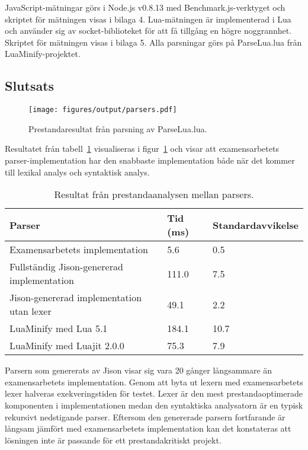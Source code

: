 JavaScript-mätningar görs i Node.js v0.8.13 med Benchmark.js-verktyget och
skriptet för mätningen visas i bilaga 4. Lua-mätningen är implementerad i Lua
och använder sig av socket-biblioteket för att få tillgång en högre
noggrannhet. Skriptet för mätningen visas i bilaga 5. Alla parsningar görs på
ParseLua.lua från LuaMinify-projektet.

\subsection{Slutsats}

\begin{figure}[ht]
  \texttt{[image: figures/output/parsers.pdf]}
  \caption{Prestandaresultat från parsning av ParseLua.lua.}
  \label{fig:parserresult}
\end{figure}

Resultatet från tabell~\ref{tab:parsers} visualiseras i
figur~\ref{fig:parserresult} och visar att examensarbetets
parser-implementation har den snabbaste implementation både när det kommer
till lexikal analys och syntaktisk analys.

\begin{table}[ht]
  \caption{Resultat från prestandaanalysen mellan parsers.}
  \begin{tabular}{l l l}
    Parser & Tid (ms) & Standardavvikelse \\
    \hline
    Examensarbetets implementation & 5.6 & 0.5 \\
    Fullständig Jison-genererad implementation & 111.0 & 7.5 \\
    Jison-genererad implementation utan lexer & 49.1 & 2.2 \\
    LuaMinify med Lua 5.1 & 184.1 & 10.7 \\
    LuaMinify med Luajit 2.0.0 & 75.3 & 7.9
  \end{tabular}
  \label{tab:parsers}
\end{table}


Parsern som genererats av Jison visar sig vara 20 gånger långsammare än
examensarbetets implementation.  Genom att byta ut lexern med examensarbetets
lexer halveras exekveringstiden för testet. Lexer är den mest
prestandaoptimerade komponenten i implementationen medan den syntaktiska
analysatorn är en typisk rekursivt nedstigande parser. Eftersom den
genererade parsern fortfarande är långsam jämfört med examensarbetets
implementation kan det konstateras att lösningen inte är passande för ett
prestandakritiskt projekt.

